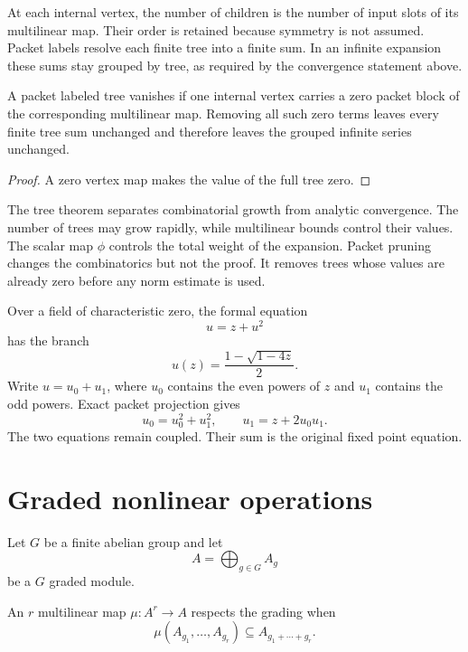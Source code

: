 \begin{interpretation}[title={Arity in a tree}]
At each internal vertex, the number of children is the number of input slots of its multilinear map. Their order is retained because symmetry is not assumed. Packet labels resolve each finite tree into a finite sum. In an infinite expansion these sums stay grouped by tree, as required by the convergence statement above.
\end{interpretation}

\begin{corollary}\label{cor:tree_pruning}
A packet labeled tree vanishes if one internal vertex carries a zero packet block of the corresponding multilinear map.  Removing all such zero terms leaves every finite tree sum unchanged and therefore leaves the grouped infinite series unchanged.
\end{corollary}

\begin{proof}
A zero vertex map makes the value of the full tree zero.
\end{proof}


The tree theorem separates combinatorial growth from analytic convergence.  The number of trees may grow rapidly, while multilinear bounds control their values. The scalar map $\phi$ controls the total weight of the expansion.  Packet pruning changes the combinatorics but not the proof.  It removes trees whose values are already zero before any norm estimate is used.

\begin{example}\label{ex:catalan_parity}
Over a field of characteristic zero, the formal equation
\[
u=z+u^2
\]
has the branch
\[
u(z)=\frac{1-\sqrt{1-4z}}2.
\]
Write $u=u_0+u_1$, where $u_0$ contains the even powers of $z$ and $u_1$ contains the odd powers.  Exact packet projection gives
\[
u_0=u_0^2+u_1^2,
\qquad
u_1=z+2u_0u_1.
\]
The two equations remain coupled.  Their sum is the original fixed point equation.
\end{example}

\section{Graded nonlinear operations}\label{sec:graded_operations}

Let $G$ be a finite abelian group and let
\[
A=\bigoplus_{g\in G}A_g
\]
be a $G$ graded module.

\begin{definition}\label{def:grade_respecting}
An $r$ multilinear map $\mu:A^r\to A$ respects the grading when
\[
\mu(A_{g_1},\ldots,A_{g_r})
\subseteq
A_{g_1+\cdots+g_r}.
\]
\end{definition}

